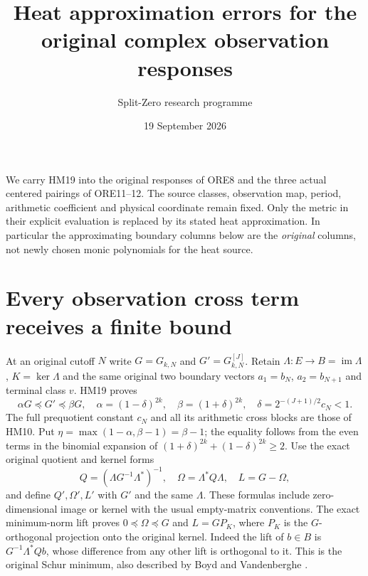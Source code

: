 \documentclass[11pt]{article}
\title{Heat approximation errors for the original complex observation responses}
\author{Split-Zero research programme}\date{19 September 2026}
\begin{document}
\maketitle
We carry HM19 into the original responses of ORE8 and the three actual
centered pairings of ORE11--12. The source classes, observation map,
period, arithmetic coefficient and physical coordinate remain fixed.
Only the metric in their explicit evaluation is replaced by its stated
heat approximation. In particular the approximating boundary columns
below are the \emph{original} columns, not newly chosen monic polynomials
for the heat source.

\section{Every observation cross term receives a finite bound}
At an original cutoff $N$ write $G=G_{k,N}$ and
$G'=G_{k,N}^{[J]}$. Retain $\Lambda:E\to B=\operatorname{im}\Lambda$,
$K=\ker\Lambda$ and the same original two boundary vectors
$a_1=b_N$, $a_2=b_{N+1}$ and terminal class $v$. HM19 proves
\begin{equation}\tag{HR1}
 \alpha G\preceq G'\preceq\beta G,
 \quad \alpha=(1-\delta)^{2k},\quad\beta=(1+\delta)^{2k},
 \quad\delta=2^{-(J+1)/2}c_N<1.
\end{equation}
The full prequotient constant $c_N$ and all its arithmetic cross blocks
are those of HM10. Put $\eta=\max(1-\alpha,\beta-1)=\beta-1$;
the equality follows from the even terms in the binomial expansion
of $(1+\delta)^{2k}+(1-\delta)^{2k}\ge2$.
Use the exact original quotient and kernel forms
\begin{equation}\tag{HR2}
 Q=(\Lambda G^{-1}\Lambda^*)^{-1},\quad
 \Omega=\Lambda^*Q\Lambda,\quad L=G-\Omega,
\end{equation}
and define $Q',\Omega',L'$ with $G'$ and the same $\Lambda$.
These formulas include zero-dimensional image or kernel with the
usual empty-matrix conventions. The exact minimum-norm lift proves
$0\preceq\Omega\preceq G$ and $L=GP_K$, where $P_K$ is the
$G$-orthogonal projection onto the original kernel. Indeed the lift
of $b\in B$ is $G^{-1}\Lambda^*Qb$, whose difference from any
other lift is orthogonal to it. This is the original Schur minimum,
also described by Boyd and Vandenberghe \cite[Appendix C.4.1]{Boyd}.
\end{document}
